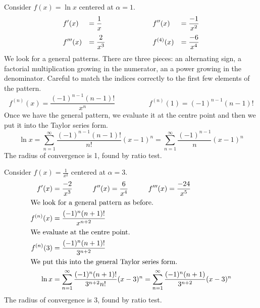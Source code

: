 \documentclass[fleqn]{report}
\begin{document}
\begin{example}
Consider $f(x) = \ln x$ centered at $\alpha = 1$. 
\begin{displaymath}
\begin{array}{*4{>{\displaystyle}l}}
f^\prime(x) & = \frac{1}{x} & 
\hspace{2cm} f^{\prime \prime}(x) & = \frac{-1}{x^2} \\[1em]
f^{\prime \prime \prime}(x) & = \frac{2}{x^3} &
\hspace{2cm} f^{(4)}(x) & = \frac{-6}{x^4} 
\end{array}
\end{displaymath}
We look for a general patterns. There are three
pieces: an alternating sign, a factorial multiplication
growing in the numerator, an a power growing in the
denominator. Careful to match the indices correctly to the
first few elements of the pattern.
\begin{equation*}
f^{(n)}(x) = \frac{(-1)^{n-1}(n-1)!}{x^n} \hspace{2cm} 
f^{(n)}(1) = (-1)^{n-1}(n-1)! 
\end{equation*}
Once we have the general pattern, we evaluate it at
the centre point and then we put it into the Taylor series form.
\begin{equation*}
\ln x = \sum_{n=1}^\infty \frac{(-1)^{n-1}(n-1)!}{n!} (x-1)^n
 = \sum_{n=1}^\infty \frac{(-1)^{n-1}}{n} (x-1)^n
\end{equation*}
The radius of convergence is 1, found by ratio test.
\end{example}

\begin{example}
Consider $f(x) = \frac{1}{x^2}$ centered at $\alpha = 3$. 
\begin{align*}
f^\prime(x) & = \frac{-2}{x^3} \hspace{1cm} 
f^{\prime \prime}(x) = \frac{6}{x^4} \hspace{1cm} 
f^{\prime \prime \prime}(x) = \frac{-24}{x^5} \\
\intertext{We look for a general pattern as before.}
f^{(n)}(x) & = \frac{(-1)^{n}(n+1)!}{x^{n+2}} \\
\intertext{We evaluate at the centre point.}
f^{(n)}(3) & = \frac{(-1)^{n}(n+1)!}{3^{n+2}} \\
\intertext{We put this into the general Taylor series form.}
\ln x & = \sum_{n=1}^\infty \frac{(-1)^{n}(n+1)!}{3^{n+2} n!}
(x-3)^n = \sum_{n=1}^\infty \frac{(-1)^n (n+1)}{3^{n+2}}
(x-3)^n
\end{align*}
The radius of convergence is 3, found by ratio test.
\end{example}
\end{document}
